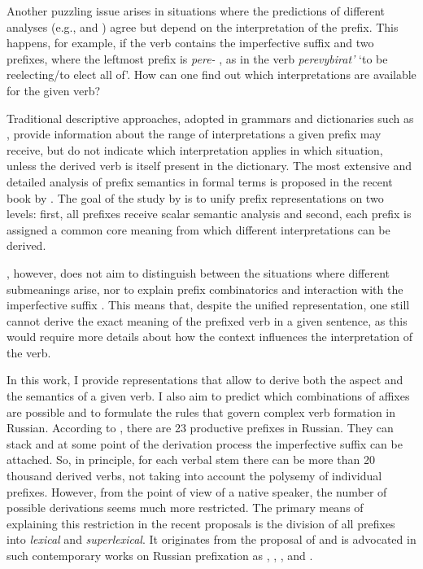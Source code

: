 Another puzzling issue arises in situations where the predictions of different analyses (e.g., \citealt{Svenonius:04b} and \citealt{Tatevosov:07}) agree but depend on the interpretation of the prefix. This happens, for example, if the verb contains the imperfective suffix   and two prefixes, where the leftmost prefix is \textit{pere-}  , as in the verb \textit{perevybirat'} `to be reelecting/to elect all of'. How can one find out which interpretations are available for the given verb? 

\hspace*{-0.64717pt}Traditional descriptive approaches, adopted in grammars and dictionaries such as \citet{Shvedova:82}, provide information about the range of interpretations a given prefix may receive, but do not indicate which interpretation applies in which situation, unless the derived verb is itself present in the dictionary. The most extensive and detailed analysis of prefix semantics in formal terms is proposed in the recent book by \citet{Kagan:book}. The goal of the study by \citet{Kagan:book} is to unify prefix representations on two levels: first, all prefixes receive scalar semantic analysis and second, each prefix is assigned a common core meaning from which different interpretations can be derived. 

\citet{Kagan:book}, however, does not aim to distinguish between the situations where different submeanings arise, nor to explain prefix combinatorics  and interaction with the imperfective suffix  . This means that, despite the unified representation, one still cannot derive the exact meaning of the prefixed verb in a given sentence, as this would require more details about how the context   influences the interpretation of the verb.

In this work, I provide representations that allow to derive both the aspect and the semantics of a given verb. I also aim to predict which combinations of affixes are possible and to formulate the rules that govern complex verb formation in Russian. According to \citet{Shvedova:82}, there are 23 productive prefixes in Russian. They can stack and at some point of the derivation process the imperfective suffix   can be attached. So, in principle, for each verbal stem there can be more than 20 thousand derived verbs, not taking into account the polysemy of individual prefixes. However, from the point of view of a native speaker, the number of possible derivations seems much more restricted. The primary means of explaining this restriction in the recent proposals is the division of all prefixes into \textit{lexical} and \textit{superlexical}. It originates from the proposal of \citet{Isachenko:60} and is advocated in such contemporary works on Russian prefixation  as \citet{Ramchand:04}, \citet{Svenonius:04b}, \citet{Romanova:06}, and \citet{Tatevosov:07, Tatevosov:09}.

